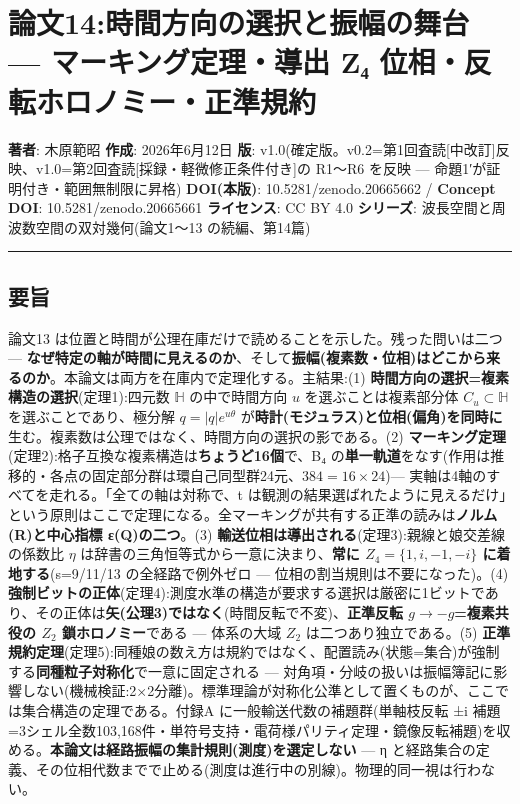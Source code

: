 \documentclass[
]{ltjsarticle}
\author{}
\date{}
\begin{document}
\section{論文14:時間方向の選択と振幅の舞台 --- マーキング定理・導出 Z₄
位相・反転ホロノミー・正準規約}\label{ux8ad6ux658714ux6642ux9593ux65b9ux5411ux306eux9078ux629eux3068ux632fux5e45ux306eux821eux53f0-ux30deux30fcux30adux30f3ux30b0ux5b9aux7406ux5c0eux51fa-zux2084-ux4f4dux76f8ux53cdux8ee2ux30dbux30edux30ceux30dfux30fcux6b63ux6e96ux898fux7d04}

\textbf{著者}: 木原範昭 \textbf{作成}: 2026年6月12日 \textbf{版}:
v1.0(確定版。v0.2=第1回査読{[}中改訂{]}反映、v1.0=第2回査読{[}採録・軽微修正条件付き{]}の
R1〜R6 を反映 --- 命題1′が証明付き・範囲無制限に昇格)
\textbf{DOI(本版)}: 10.5281/zenodo.20665662 / \textbf{Concept DOI}:
10.5281/zenodo.20665661 \textbf{ライセンス}: CC BY 4.0
\textbf{シリーズ}: 波長空間と周波数空間の双対幾何(論文1〜13
の続編、第14篇)

\begin{center}\rule{0.5\linewidth}{0.5pt}\end{center}

\subsection{要旨}\label{ux8981ux65e8}

論文13 は位置と時間が公理在庫だけで読めることを示した。残った問いは二つ
---
\textbf{なぜ特定の軸が時間に見えるのか}、そして\textbf{振幅(複素数・位相)はどこから来るのか}。本論文は両方を在庫内で定理化する。主結果:(1)
\textbf{時間方向の選択=複素構造の選択}(定理1):四元数 \(\mathbb{H}\)
の中で時間方向 \(u\) を選ぶことは複素部分体 \(C_u\subset\mathbb{H}\)
を選ぶことであり、極分解 \(q=|q|e^{u\theta}\)
が\textbf{時計(モジュラス)と位相(偏角)を同時に}生む。複素数は公理ではなく、時間方向の選択の影である。(2)
\textbf{マーキング定理}(定理2):格子互換な複素構造は\textbf{ちょうど16個}で、B₄
の\textbf{単一軌道}をなす(作用は推移的・各点の固定部分群は環自己同型群24元、\(384=16\times24\))---
実軸は4軸のすべてを走れる。「全ての軸は対称で、t
は観測の結果選ばれたように見えるだけ」という原則はここで定理になる。全マーキングが共有する正準の読みは\textbf{ノルム(R)と中心指標
ε(Q)の二つ}。(3)
\textbf{輸送位相は導出される}(定理3):親線と娘交差線の係数比 \(\eta\)
は辞書の三角恒等式から一意に決まり、\textbf{常に \(Z_4=\{1,i,-1,-i\}\)
に着地する}(s=9/11/13 の全経路で例外ゼロ ---
位相の割当規則は不要になった)。(4)
\textbf{強制ビットの正体}(定理4):測度水準の構造が要求する選択は厳密に1ビットであり、その正体は\textbf{矢(公理3)ではなく}(時間反転で不変)、\textbf{正準反転
\(g\to-g\)=複素共役の \(Z_2\) 鎖ホロノミー}である --- 体系の大域 \(Z_2\)
は二つあり独立である。(5)
\textbf{正準規約定理}(定理5):同種娘の数え方は規約ではなく、配置読み(状態=集合)が強制する\textbf{同種粒子対称化}で一意に固定される
---
対角項・分岐の扱いは振幅簿記に影響しない(機械検証:2×2分離)。標準理論が対称化公準として置くものが、ここでは集合構造の定理である。付録A
に一般輸送代数の補題群(単軸枝反転 ±i
補題=3シェル全数103,168件・単符号支持・電荷様パリティ定理・鏡像反転補題)を収める。\textbf{本論文は経路振幅の集計規則(測度)を選定しない}
--- η
と経路集合の定義、その位相代数までで止める(測度は進行中の別線)。物理的同一視は行わない。
\end{document}
